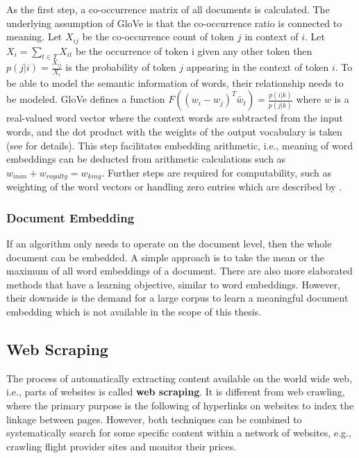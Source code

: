 As the first step, a co-occurrence matrix of all documents is calculated. The underlying assumption of GloVe is that the co-occurrence ratio is connected to meaning.
Let $X_{ij}$ be the co-occurrence count of token $j$ in context of $i$. Let $X_i = \sum_{t \in T} X_{it}$ be the occurrence of token i given any other token then $p(j|i) = \frac{X_{ij}}{X_i}$ is the probability of token $j$ appearing in the context of token $i$.
To be able to model the semantic information of words, their relationship needs to be modeled. GloVe defines a function $F((w_i-w_j)^T \widetilde{w_t}) = \frac{p(i|k)}{p(j|k)}$ where $w$ is a real-valued word vector where the context words are subtracted from the input words, and the dot product with the weights of the output vocabulary is taken (see \cite{Pennington2014} for details). This step facilitates embedding arithmetic, i.e., meaning of word embeddings can be deducted from arithmetic calculations such as $w_{man} + w_{royalty} = w_{king}$. Further steps are required for computability, such as weighting of the word vectors or handling zero entries which are described by \cite{Pennington2014}.


\subsubsection{Document Embedding}
If an algorithm only needs to operate on the document level, then the whole document can be embedded. A simple approach is to take the mean or the maximum of all word embeddings of a document. There are also more elaborated methods \citep{Wu2018, Liu2018, Andrew2015} that have a learning objective, similar to word embeddings. However, their downside is the demand for a large corpus to learn a meaningful document embedding which is not available in the scope of this thesis.

\subsection{Web Scraping}
The process of automatically extracting content available on the world wide web, i.e., parts of websites is called \textbf{web scraping}. It is different from web crawling, where the primary purpose is the following of hyperlinks on websites to index the linkage between pages. However, both techniques can be combined to systematically search for some specific content within a network of websites, e.g., crawling flight provider sites and monitor their prices.

